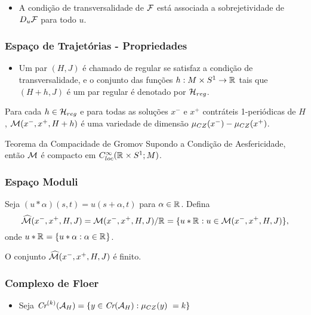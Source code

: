 \documentclass{beamer}
\begin{document}
\begin{footnotesize}
\begin{frame}
\begin{itemize}
			\item A condição de transversalidade de $\mathcal{F}$ está associada a sobrejetividade de $D_{u}\mathcal{F}$ para todo $u$.
		\end{itemize}
	\end{frame}
	
	\begin{frame}
		\frametitle{Espaço de Trajetórias - Propriedades}
		\begin{itemize}
			
			\item Um par $(H, J)$ é chamado de regular se satisfaz a condição de transversalidade, e o conjunto das funções $h:M\times S^{1} \to \mathbb{R}^{}$ tais que $(H+h,J)$ é um par regular é denotado por $\mathcal{H}_{reg}$.
		\end{itemize}
		
		\begin{teorema}
			Para cada $h \in \mathcal{H}_{reg}$ e para todas as soluções $x^{-}$ e $x^{+}$ contráteis 1-periódicas de $H$, $\mathcal{M}(x^{-}, x^{+}, H+h)$ é uma variedade de dimensão $\mu_{CZ}(x^{-})-\mu_{CZ}(x^{+})$.
		\end{teorema}
		
			
			\begin{teorema}{Teorema da Compacidade de Gromov}
				Supondo a Condição de Aesfericidade, então $\mathcal{M}$ é compacto em $C^{\infty}_{loc}(\mathbb{R}^{} \times S^{1}; M)$.
			\end{teorema}
	\end{frame}
	
	\begin{frame}
		\frametitle{Espaço Moduli}
		Seja $(u*\alpha)(s,t) = u(s+\alpha,t)$ para $\alpha \in \mathbb{R}^{}$.  Defina
		$$
		\widehat{\mathcal{M}}(x^{-}, x^{+}, H, J) = \mathcal{M}(x^{-},x^{+}, H, J)/\mathbb{R}^{}=\{u*\mathbb{R}^{}: u\in \mathcal{M}(x^{-},x^{+}, H, J)\},
		$$ 
		onde $u*\mathbb{R}^{} = \{u*\alpha:\alpha \in \mathbb{R}^{}\}$.
		
		\begin{teorema}
			O conjunto $\widehat{\mathcal{M}}(x^{-}, x^{+}, H, J)$ é finito.
		\end{teorema}
	\end{frame}
	
	\begin{frame}
		\frametitle{Complexo de Floer}
				
			\begin{itemize}
				\item Seja $
				\textit{Cr}^{(k)}(\mathcal{A}_{H}) = \{ y \in \textit{Cr}(\mathcal{A}_{H}): \mu_{CZ}(y) \ =	 k\}$
				

\end{itemize}
\end{frame}
\end{footnotesize}
\end{document}
